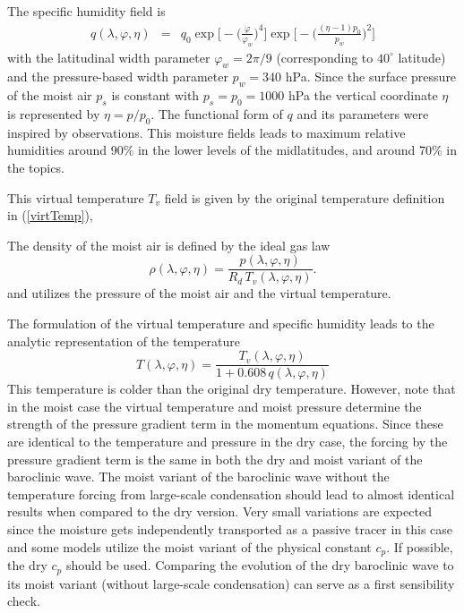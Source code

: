 \documentclass{article}
\begin{document}
The specific humidity field is 
\begin{eqnarray}
q(\lambda, \varphi, \eta) &=& q_0 \exp\Bigg[- \Big(\frac{\varphi}{\varphi_{w}}\Big)^4 \Bigg] \exp\Bigg[- \Bigg(\frac{(\eta-1)p_0}{p_{w}}\Bigg)^2  \Bigg]
\end{eqnarray}
with the latitudinal width parameter $\varphi_{w} = 2 \pi / 9$ (corresponding to $40^\circ$ latitude) and the pressure-based width parameter $p_w = 340$ hPa. Since the surface pressure of the moist air $p_s$ is constant with $p_s = p_0 = 1000$ hPa  the vertical coordinate $\eta$ is represented by $\eta = p/p_0$. The functional form of $q$ and its parameters were inspired by observations. This moisture fields leads to maximum relative humidities around 90\% in the lower levels of the midlatitudes, and around 70\% in the topics.

This virtual temperature $T_v$ field is given by the original temperature definition in (\ref{virtTemp}),

The density of the moist air is defined by the ideal gas law
\begin{equation} \label{eq:density_test4m}
\rho(\lambda, \varphi, \eta) = \frac{p(\lambda, \varphi, \eta)}{R_d \,T_v(\lambda, \varphi, \eta)}.
\end{equation} 
and utilizes the pressure of the moist air and the virtual temperature.

The formulation of the virtual temperature and specific humidity leads to the analytic representation of the temperature
\begin{equation}
\label{test42:T}
T(\lambda,\varphi,\eta) = \frac{T_v(\lambda,\varphi,\eta)}{1+0.608 \,q(\lambda, \varphi, \eta)}
\end{equation}
This temperature is colder than the original dry temperature. However, note that in the moist case the virtual temperature and moist pressure determine the strength of the pressure gradient term in the momentum equations. Since these are identical to the temperature and pressure in the dry case, the forcing by the pressure gradient term is the same in both the dry and moist variant of the baroclinic wave. The moist variant of the baroclinic wave without the temperature forcing from large-scale condensation should lead to almost identical results when compared to the dry version. Very small variations are expected since the moisture gets independently transported as a passive tracer in this case and some models utilize the moist variant of the physical constant $c_p$. If possible, the dry $c_p$ should be used. Comparing the evolution of the dry baroclinic wave to its moist variant (without large-scale condensation) can serve as a first sensibility check.
\end{document}
